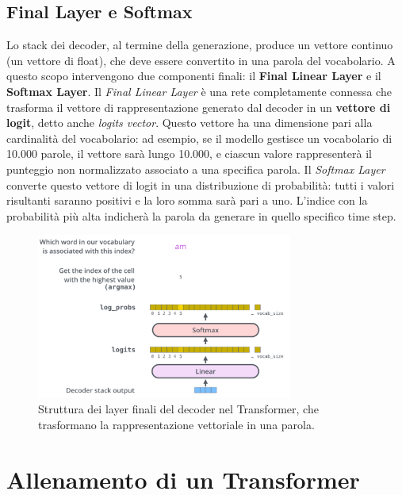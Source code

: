 \subsection{Final Layer e Softmax}

Lo stack dei decoder, al termine della generazione, produce un vettore continuo (un vettore di float), che deve essere convertito in una parola del vocabolario. A questo scopo intervengono due componenti finali: il \textbf{Final Linear Layer} e il \textbf{Softmax Layer}. Il \textit{Final Linear Layer} è una rete completamente connessa che trasforma il vettore di rappresentazione generato dal decoder in un \textbf{vettore di logit}, detto anche \textit{logits vector}. Questo vettore ha una dimensione pari alla cardinalità del vocabolario: ad esempio, se il modello gestisce un vocabolario di 10.000 parole, il vettore sarà lungo 10.000, e ciascun valore rappresenterà il punteggio non normalizzato associato a una specifica parola. Il \textit{Softmax Layer} converte questo vettore di logit in una distribuzione di probabilità: tutti i valori risultanti saranno positivi e la loro somma sarà pari a uno. L’indice con la probabilità più alta indicherà la parola da generare in quello specifico time step.

\begin{figure}
    \centering
    \includegraphics[width=0.75\textwidth]{figure/FinalLayer.png}
    \caption{Struttura dei layer finali del decoder nel Transformer, che trasformano la rappresentazione vettoriale in una parola.}
    \label{fig:FinLay}
\end{figure}

\section{Allenamento di un Transformer}

